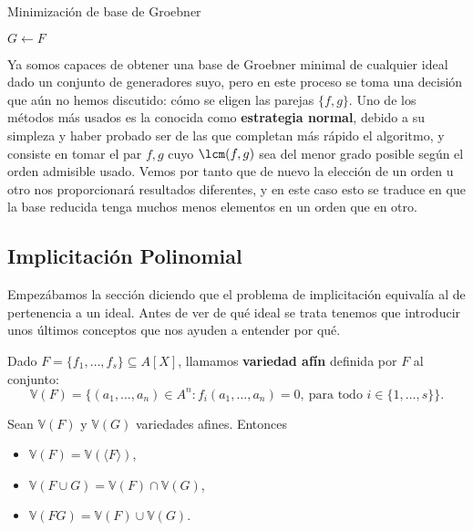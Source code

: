 \begin{algorithm}[hbt!]
    \caption{Minimización de base de Groebner}\label{a:minim}

    $G\gets F$\;

\end{algorithm}

Ya somos capaces de obtener una base de Groebner minimal de cualquier ideal dado un conjunto de generadores suyo, pero en este proceso se toma una decisión que aún no hemos discutido: cómo se eligen las parejas $\{f,g\}$. Uno de los métodos más usados es la conocida como \textbf{estrategia normal}, debido a su simpleza y haber probado ser de las que completan más rápido el algoritmo, y consiste en tomar el par $f,g$ cuyo $\lcm(f,g)$ sea del menor grado posible según el orden admisible usado. Vemos por tanto que de nuevo la elección de un orden u otro nos proporcionará resultados diferentes, y en este caso esto se traduce en que la base reducida tenga muchos menos elementos en un orden que en otro.

\subsection{Implicitación Polinomial}
Empezábamos la sección diciendo que el problema de implicitación equivalía al de pertenencia a un ideal. Antes de ver de qué ideal se trata tenemos que introducir unos últimos conceptos que nos ayuden a entender por qué.

\begin{definicion}Dado $F=\{f_1,\dots, f_s\} \subseteq A[X]$, llamamos \textbf{variedad afín} definida por $F$ al conjunto:
    \begin{equation*}
        \mathbb{V}(F) = \{(a_1,\dots, a_n)\in A^n : f_i(a_1,\dots, a_n)=0,\ \text{para todo } i\in\{1,\dots, s\}\}.
    \end{equation*}
\end{definicion}

\begin{proposicion}
    Sean $\mathbb{V}(F)$ y $\mathbb{V}(G)$ variedades afines. Entonces
    \begin{itemize}
        \item  $\mathbb{V}(F) =  \mathbb{V}(\langle F\rangle)$,
        \item $\mathbb{V}(F\cup G) = \mathbb{V}(F) \cap \mathbb{V}(G)$,
        \item $\mathbb{V}(FG) = \mathbb{V}(F) \cup \mathbb{V}(G)$.
    \end{itemize}
\end{proposicion}


